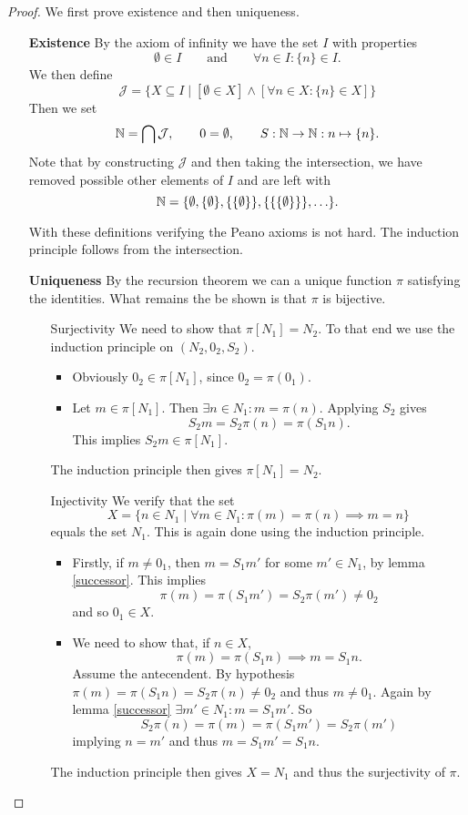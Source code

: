 \begin{proof}
We first prove existence and then uniqueness.
\begin{itemize}
\item[\textbf{Existence}] By the axiom of infinity we have the set $I$ with properties
\[ \emptyset\in I \qquad \text{and}\qquad \forall n\in I: \{n\}\in I. \]
We then define
\[ \mathcal{J} = \{ X\subseteq I\;|\;[\emptyset\in X] \land [\forall n\in X: \{n\} \in X] \} \]
Then we set
\[ \mathbb{N} = \bigcap \mathcal{J},\qquad 0 = \emptyset, \qquad S: \mathbb{N}\to\mathbb{N}: n\mapsto \{n\}. \]
Note that by constructing $\mathcal{J}$ and then taking the intersection, we have removed possible other elements of $I$ and are left with
\[ \mathbb{N} = \{ \emptyset, \{\emptyset\}, \{\{\emptyset\}\}, \{\{\{\emptyset\}\}\}, \ldots \}. \]

With these definitions verifying the Peano axioms is not hard. The induction principle follows from the intersection.
\item[\textbf{Uniqueness}] By the recursion theorem we can a unique function $\pi$ satisfying the identities. What remains the be shown is that $\pi$ is bijective.
\begin{itemize}
\item[Surjectivity] We need to show that $\pi[N_1] = N_2$. To that end we use the induction principle on $(N_2,0_2, S_2)$.
\begin{itemize}
\item Obviously $0_2\in \pi[N_1]$, since $0_2=\pi(0_1)$.
\item Let $m\in\pi[N_1]$. Then $\exists n\in N_1: m=\pi(n)$. Applying $S_2$ gives
\[ S_2m = S_2\pi(n) = \pi(S_1 n). \]
This implies $S_2m\in \pi[N_1]$.
\end{itemize}
The induction principle then gives $\pi[N_1] = N_2$.
\item[Injectivity] We verify that the set
\[ X = \{ n\in N_1\;|\; \forall m\in N_1: \pi(m)=\pi(n) \implies m=n \} \]
equals the set $N_1$. This is again done using the induction principle.
\begin{itemize}
\item Firstly, if $m\neq 0_1$, then $m=S_1m'$ for some $m'\in N_1$, by lemma \ref{successor}. This implies
\[ \pi(m) = \pi(S_1m') = S_2\pi(m') \neq 0_2 \]
and so $0_1\in X$.
\item We need to show that, if $n\in X$,
\[ \pi(m) = \pi(S_1n) \implies m = S_1n. \]
Assume the antecendent. By hypothesis $\pi(m) = \pi(S_1n) = S_2\pi(n) \neq 0_2$ and thus $m\neq 0_1$. Again by lemma \ref{successor} $\exists m'\in N_1: m = S_1m'$. So
\[ S_2\pi(n) = \pi(m) = \pi(S_1m') = S_2\pi(m') \]
implying $n=m'$ and thus $m=S_1m'=S_1n$.
\end{itemize}
The induction principle then gives $X=N_1$ and thus the surjectivity of $\pi$.
\end{itemize}
\end{itemize}
\end{proof}

